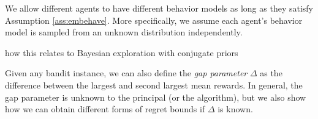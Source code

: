 We allow different agents to have different behavior models as long as
they satisfy Assumption \ref{ass:embehave}. More specifically, we
assume each agent's behavior model is sampled from an unknown
distribution independently.
\begin{remark}
  how this relates to Bayesian exploration with conjugate
  priors
\end{remark}

Given any bandit instance, we can also define the \emph{gap parameter}
$\Delta$ as the difference between the largest and second largest mean
rewards. In general, the gap parameter is unknown to the principal (or
the algorithm), but we also show how we can obtain different forms of
regret bounds if $\Delta$ is known.



